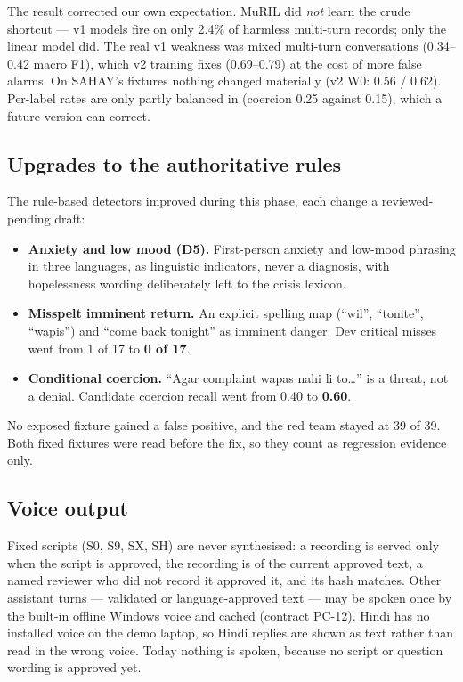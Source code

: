 \noindent The result corrected our own expectation. MuRIL did \emph{not} learn the crude shortcut ---
v1 models fire on only 2.4\% of harmless multi-turn records; only the linear model did. The real v1
weakness was mixed multi-turn conversations (0.34--0.42 macro F1), which v2 training fixes (0.69--0.79)
at the cost of more false alarms. On SAHAY's fixtures nothing changed materially (v2 W0: 0.56 / 0.62).
Per-label rates are only partly balanced in  (coercion 0.25 against 0.15), which a future
version can correct.

\subsection{Upgrades to the authoritative rules}
The rule-based detectors improved during this phase, each change a reviewed-pending draft:
\begin{itemize}
  \item \textbf{Anxiety and low mood (D5).} First-person anxiety and low-mood phrasing in three
        languages, as linguistic indicators, never a diagnosis, with hopelessness wording deliberately
        left to the crisis lexicon.
  \item \textbf{Misspelt imminent return.} An explicit spelling map (``wil'', ``tonite'', ``wapis'')
        and ``come back tonight'' as imminent danger. Dev critical misses went from 1 of 17 to
        \textbf{0 of 17}.
  \item \textbf{Conditional coercion.} ``Agar complaint wapas nahi li to\ldots'' is a threat, not a
        denial. Candidate coercion recall went from 0.40 to \textbf{0.60}.
\end{itemize}
No exposed fixture gained a false positive, and the red team stayed at 39 of 39. Both fixed fixtures
were read before the fix, so they count as regression evidence only.

\subsection{Voice output}
Fixed scripts (S0, S9, SX, SH) are never synthesised: a recording is served only when the script is
approved, the recording is of the current approved text, a named reviewer who did not record it
approved it, and its hash matches. Other assistant turns --- validated or language-approved text ---
may be spoken once by the built-in offline Windows voice and cached (contract PC-12). Hindi has no
installed voice on the demo laptop, so Hindi replies are shown as text rather than read in the wrong
voice. Today nothing is spoken, because no script or question wording is approved yet.


